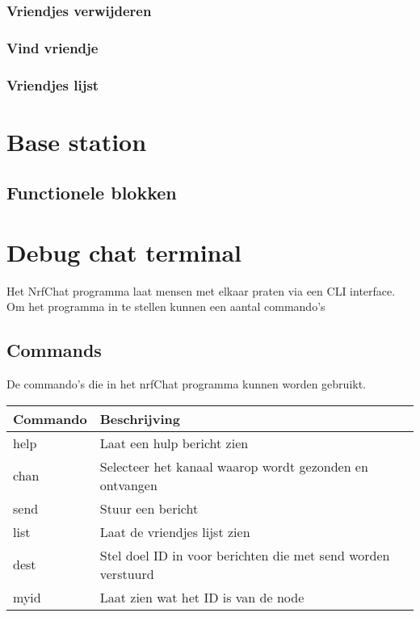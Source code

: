     \subsubsection{Vriendjes verwijderen}
    \subsubsection{Vind vriendje}
    \subsubsection{Vriendjes lijst}

\section{Base station}
    \subsection{Functionele blokken}
\section{Debug chat terminal}

Het NrfChat programma laat mensen met elkaar praten via een CLI interface. Om het programma in te stellen kunnen een aantal commando's

\subsection{Commands}
De commando's die in het nrfChat programma kunnen worden gebruikt.

\begin{table}[h]
    \begin{tabular}{|l|l|} \hline
        \textbf{Commando} & \textbf{Beschrijving} \\\hline
        help & Laat een hulp bericht zien \\\hline
        chan & Selecteer het kanaal waarop wordt gezonden en ontvangen\\\hline
        send & Stuur een bericht \\\hline
        list & Laat de vriendjes lijst zien\\\hline
        dest & Stel doel ID in voor berichten die met send worden verstuurd \\\hline
        myid & Laat zien wat het ID is van de node \\\hline
    \end{tabular}
\end{table}

